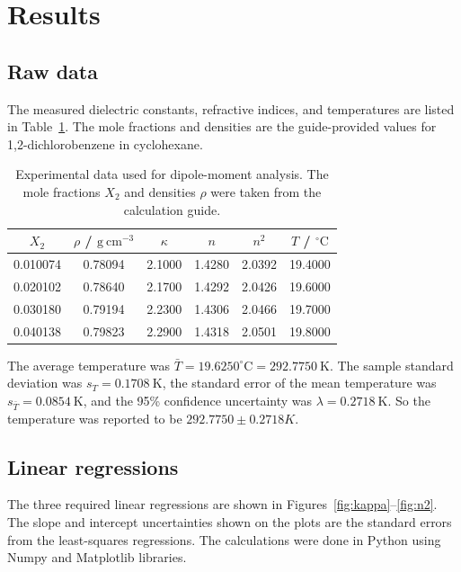 \documentclass[11pt]{article}
\begin{document}
\section*{Results}

\subsection*{Raw data}

The measured dielectric constants, refractive indices, and temperatures are listed in Table~\ref{tab:raw}. The mole fractions and densities are the guide-provided values for 1,2-dichlorobenzene in cyclohexane.\cite{lab_manual}

\begin{table}[H]
\centering
\caption{Experimental data used for dipole-moment analysis. The mole fractions $X_2$ and densities $\rho$ were taken from the calculation guide.}
\label{tab:raw}
\begin{tabular}{cccccc}
\toprule
$X_2$ & $\rho$ / $\mathrm{g\ cm^{-3}}$ & $\kappa$ & $n$ & $n^2$ & $T$ / $^\circ\mathrm{C}$ \\
\midrule
0.010074 & 0.78094 & 2.1000 & 1.4280 & 2.0392 & 19.4000 \\
0.020102 & 0.78640 & 2.1700 & 1.4292 & 2.0426 & 19.6000 \\
0.030180 & 0.79194 & 2.2300 & 1.4306 & 2.0466 & 19.7000 \\
0.040138 & 0.79823 & 2.2900 & 1.4318 & 2.0501 & 19.8000 \\
\bottomrule
\end{tabular}
\end{table}

The average temperature was $\bar T=19.6250^\circ\mathrm{C}=292.7750\ \mathrm{K}$. The sample standard deviation was $s_T=0.1708\ \mathrm{K}$, the standard error of the mean temperature was $s_{\bar T}=0.0854\ \mathrm{K}$, and the 95\% confidence uncertainty was $\lambda=0.2718\ \mathrm{K}$. So the temperature was reported to be $292.7750\pm0.2718K$.

\subsection*{Linear regressions}

The three required linear regressions are shown in Figures~\ref{fig:kappa}--\ref{fig:n2}. The slope and intercept uncertainties shown on the plots are the standard errors from the least-squares regressions. The calculations were done in Python using Numpy\cite{harris2020array} and Matplotlib\cite{Hunter2007} libraries.
\end{document}

